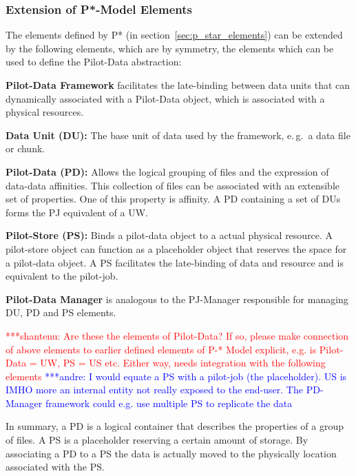 \documentclass[conference,final]{IEEEtran}
\newcommand{\jhanote}[1]{ {\textcolor{red} { ***shantenu: #1 }}}
\newcommand{\alnote}[1]{ {\textcolor{blue} { ***andre: #1 }}}
\newcommand{\alnote}[1]{}
\newcommand{\jhanote}[1]{}
\begin{document}
\subsubsection*{Extension of P*-Model Elements}

The elements defined by P* (in section~\ref{sec:p_star_elements}) can be
extended by the following elements, which are by symmetry, the
elements which can be used to define the Pilot-Data abstraction:
\begin{compactenum}[A.]
\item \textbf{Pilot-Data Framework} facilitates the late-binding between data 
 units that can dynamically associated with a Pilot-Data object, which is 
 associated with a physical resources. 
\item \textbf{Data Unit (DU):} The base unit of data used by the framework,
  e.\,g.\ a data file or chunk. 
\item \textbf{Pilot-Data (PD):} Allows the logical grouping of files
  and the expression of data-data affinities. This collection of files
  can be associated with an extensible set of properties. One of this 
  property is affinity. A PD containing a set of DUs forms the PJ equivalent of  	
  a UW.
\item \textbf{Pilot-Store (PS):} Binds a pilot-data object to a actual
  physical resource. A pilot-store object can function as a
  placeholder object that reserves the space for a pilot-data object. A PS  
  facilitates the late-binding of data and resource and is equivalent to the 
  pilot-job.
\item \textbf{Pilot-Data Manager} is analogous to the PJ-Manager responsible for 
  managing DU, PD and PS elements. 
\end{compactenum}

\jhanote{Are these the elements of Pilot-Data? If so, please make
  connection of above elements to earlier defined elements of P-*
  Model explicit, e.g. is Pilot-Data = UW, PS = US etc. Either way,
  needs integration with the following elements}
\alnote{I would equate a PS with a pilot-job (the placeholder). US 
is IMHO more an internal entity not really exposed to the end-user. The PD-Manager
framework could e.g. use multiple PS to replicate the data}

In summary, a PD is a logical container that describes the properties of a group
of files. A PS is a placeholder reserving a certain amount of storage. By
associating a PD to a PS the data is actually moved to the physically location
associated with the PS.  
\end{document}
